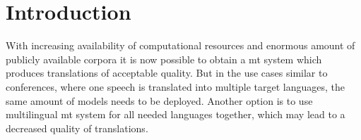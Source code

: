 \chapter*{Introduction}
With increasing availability of computational resources and enormous amount
of publicly available corpora it is now possible to obtain
a \acrfull{mt} system which produces translations of acceptable quality.
But in the use cases similar to conferences, where one speech is translated
into multiple target languages, the same amount of models needs to be deployed.
Another option is to use multilingual \acrshort{mt} system for all needed languages together,
which may lead to a decreased quality of translations. \par

